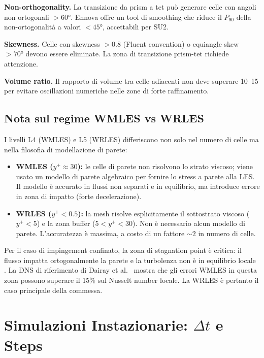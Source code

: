 \documentclass[11pt,a4paper]{article}
\begin{document}
\textbf{Non-orthogonality.} La transizione da prism a tet può generare celle con angoli non ortogonali $>60°$. Ennova offre un tool di smoothing che riduce il $P_{90}$ della non-ortogonalità a valori $<45°$, accettabili per SU2.

\textbf{Skewness.} Celle con skewness $>0.8$ (Fluent convention) o equiangle skew $>70°$ devono essere eliminate. La zona di transizione prism-tet richiede attenzione.

\textbf{Volume ratio.} Il rapporto di volume tra celle adiacenti non deve superare 10--15 per evitare oscillazioni numeriche nelle zone di forte raffinamento.

\subsection{Nota sul regime WMLES vs WRLES}

I livelli L4 (WMLES) e L5 (WRLES) differiscono non solo nel numero di celle ma nella filosofia di modellazione di parete:

\begin{itemize}
  \item \textbf{WMLES ($y^+ \approx 30$):} le celle di parete non risolvono lo strato viscoso; viene usato un modello di parete algebraico per fornire lo stress a parete alla LES. Il modello è accurato in flussi non separati e in equilibrio, ma introduce errore in zona di impatto (forte decelerazione).
  \item \textbf{WRLES ($y^+ < 0.5$):} la mesh risolve esplicitamente il sottostrato viscoso ($y^+ < 5$) e la zona buffer ($5 < y^+ < 30$). Non è necessario alcun modello di parete. L'accuratezza è massima, a costo di un fattore $\sim 2$ in numero di celle.
\end{itemize}

Per il caso di impingement confinato, la zona di stagnation point è critica: il flusso impatta ortogonalmente la parete e la turbolenza non è in equilibrio locale \cite{Hadziabdic2008}. La DNS di riferimento di Dairay et al.\ \cite{Dairay2015} mostra che gli errori WMLES in questa zona possono superare il 15\% sul Nusselt number locale. La WRLES è pertanto il caso principale della commessa.

\section{Simulazioni Instazionarie: \texorpdfstring{$\Delta t$}{Dt} e Steps}
\label{sec:simparams}
\end{document}
